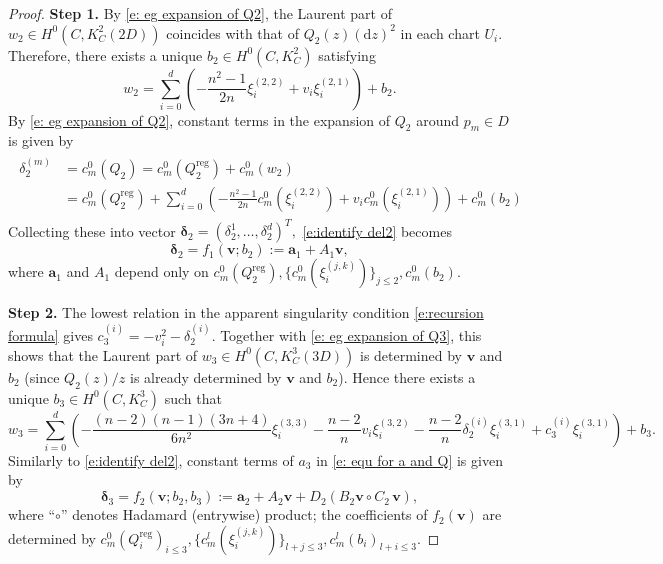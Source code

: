 \documentclass[twoside, 11pt]{article}
\numberwithin{equation}{section}
\theoremstyle{theorem}
\numberwithin{theorem}{section}
\theoremstyle{definition}
\begin{document}
\begin{proof}
\textbf{Step 1.}  By \eqref{e: eg expansion of Q2}, the Laurent part of $w_2 \in H^0 \left(C, K_C^2(2D)\right)$ coincides with that of $Q_2(z)(\mathrm d z)^2$ in each chart $U_i$. Therefore, there exists a unique $b_2 \in H^0\left(C, K_C^2\right)$ satisfying
$$
w_2= \sum_{i=0}^d \left( -\frac{n^2-1}{2n}\xi_i^{(2,2)} + v_i \xi_i^{(2,1)} \right) + b_2.
$$
By \eqref{e: eg expansion of Q2}, constant terms in the expansion of $Q_2$ around $p_m\in D$ is given by
\begin{align}\label{e:identify del2}
\begin{split}
\delta^{(m)}_2 &= c^0_m(Q_2)=c^0_m(Q^{\mathrm{reg}}_2)+c^0_m(w_2)\\
&= c^0_m(Q^{\mathrm{reg}}_2)+\sum_{i=0}^d \left( -\frac{n^2-1}{2n}c^0_m \left(\xi_i^{(2,2)}\right) + v_i c^0_m \left( \xi_i^{(2,1)} \right) \right) + c^0_m(b_2)
\end{split}
\end{align}
Collecting these into vector
\(
\boldsymbol{\delta}_2=(\delta_2^1,\dots,\delta_2^d)^{T},
\)
\eqref{e:identify del2} becomes
\[
\boldsymbol{\delta}_2= f_1(\boldsymbol v;b_2) := \boldsymbol{a}_1+A_1 \boldsymbol{v},
\]
where \(\boldsymbol{a}_1\) and \(A_1\) depend only on \(c^0_m(Q^{\mathrm{reg}}_2),\{c^0_m(\xi_i^{(j,k)})\}_{j \leq 2}, c^0_m(b_2)\).


\medskip
\noindent
\textbf{Step 2.}  
The lowest relation in the apparent singularity condition \eqref{e:recursion formula} gives \(c_3^{(i)}=-v_i^2-\delta_2^{(i)}\). 
Together with \eqref{e: eg expansion of Q3}, this shows that the Laurent part of $w_3\in H^0\!\left(C,K_C^3(3D)\right)$ is determined by $\boldsymbol v$ and $b_2$ (since $Q_2(z)/z$ is already determined by $\boldsymbol v$ and $b_2$). Hence there exists a unique $b_3\in H^0(C,K_C^3)$ such that
$$
w_3= \sum_{i=0}^d \left( -\frac{(n-2)(n-1)(3n+4)}{6n^2}\xi_i^{(3,3)} - \frac{n-2}{n} v_i \xi_i^{(3,2)} - \frac{n-2}{n} \delta^{(i)}_2 \xi_i^{(3,1)} + c_3^{(i)}\xi_i^{(3,1)}\right) + b_3.
$$
Similarly to \eqref{e:identify del2}, constant terms of $a_3$ in \eqref{e: equ for a and Q} is given by
\[
\boldsymbol{\delta}_3 = f_2(\boldsymbol v;b_2,b_3) :=\boldsymbol{a}_2 + A_2\boldsymbol v + D_2 \left( B_2\boldsymbol v\circ C_2\,\boldsymbol v \right),
\]
where “\(\circ\)” denotes Hadamard (entrywise) product; the coefficients of $f_2(\boldsymbol v)$ are determined by \(c^0_m(Q^{\mathrm{reg}}_i)_{i \leq 3},\{c^l_m(\xi_i^{(j,k)})\}_{l+j \leq 3}, c^l_m(b_i)_{l+i\leq 3}\).


\end{proof}
\end{document}
